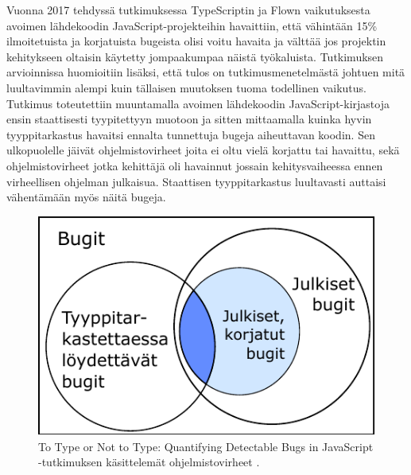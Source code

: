Vuonna 2017 tehdyssä tutkimuksessa \cite{ToTypeOrNotToType} TypeScriptin
ja Flown vaikutuksesta avoimen
lähdekoodin JavaScript-projekteihin havaittiin, että vähintään 15\%
ilmoitetuista ja korjatuista bugeista olisi voitu havaita ja välttää jos
projektin kehitykseen oltaisin käytetty jompaakumpaa näistä työkaluista.
Tutkimuksen arvioinnissa huomioitiin lisäksi, että tulos on tutkimusmenetelmästä
johtuen mitä luultavimmin alempi kuin tällaisen muutoksen tuoma todellinen
vaikutus. Tutkimus toteutettiin muuntamalla avoimen lähdekoodin
JavaScript-kirjastoja ensin staattisesti tyypitettyyn muotoon ja sitten
mittaamalla kuinka hyvin tyyppitarkastus havaitsi ennalta tunnettuja bugeja
aiheuttavan koodin. Sen ulkopuolelle jäivät ohjelmistovirheet joita ei oltu vielä
korjattu tai havaittu, sekä ohjelmistovirheet jotka kehittäjä oli havainnut jossain
kehitysvaiheessa ennen virheellisen ohjelman julkaisua. Staattisen
tyyppitarkastus luultavasti auttaisi vähentämään myös näitä bugeja.

\begin{figure}
\centering
\includegraphics{images/to_type_or_not_to_type_venn.pdf}
\caption{To Type or Not to Type: Quantifying Detectable Bugs in JavaScript
         -tutkimuksen käsittelemät ohjelmistovirheet \cite{ToTypeOrNotToType}.}
\label{fig:ToTypeOrNotToType}
\end{figure}

